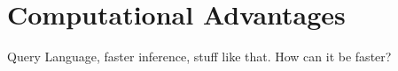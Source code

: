 \section{Computational Advantages}
\label{sec:methods:comp_advantages}

Query Language, faster inference, stuff like that.
How can it be faster?

\blindtext[2]
